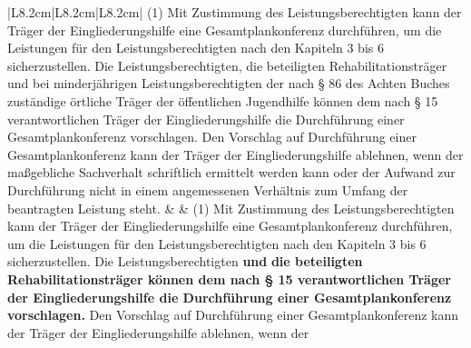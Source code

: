 \documentclass[10pt,a4paper,landscape]{article}
\begin{document}
\begin{longtable}{|L{8.2cm}|L{8.2cm}|L{8.2cm}|}
(1) Mit Zustimmung des  \newline Leistungsberechtigten kann der Träger der  \newline Eingliederungshilfe eine  \newline Gesamtplankonferenz durchführen, um die  \newline Leistungen für den Leistungsberechtigten  \newline nach den Kapiteln 3 bis 6 sicherzustellen.  \newline Die \textcolor{diffred}{Leistungsberechtigten,} die beteiligten  \newline Rehabilitationsträger \textcolor{diffred}{und bei  \newline minderjährigen Leistungsberechtigten der  \newline nach \S{} 86 des Achten Buches zuständige  \newline örtliche Träger der öffentlichen Jugendhilfe}  \newline können dem nach \S{} 15 verantwortlichen  \newline Träger der Eingliederungshilfe die  \newline Durchführung einer Gesamtplankonferenz  \newline vorschlagen. Den Vorschlag auf  \newline Durchführung einer Gesamtplankonferenz  \newline kann der Träger der Eingliederungshilfe  \newline ablehnen, wenn der maßgebliche  \newline Sachverhalt schriftlich ermittelt werden  \newline kann oder der Aufwand zur Durchführung  \newline nicht in einem angemessenen Verhältnis  \newline zum Umfang der beantragten Leistung  \newline steht. &  & (1) Mit Zustimmung des  \newline Leistungsberechtigten kann der Träger der  \newline Eingliederungshilfe eine  \newline Gesamtplankonferenz durchführen, um die  \newline Leistungen für den Leistungsberechtigten  \newline nach den Kapiteln 3 bis 6 sicherzustellen.  \newline Die \textcolor{diffgreen}{Leistungsberechtigten }\textbf{\textcolor{diffgreen}{und}}\textbf{ die  \newline beteiligten Rehabilitationsträger können  \newline dem nach \S{} 15 verantwortlichen Träger  \newline der Eingliederungshilfe die  \newline Durchführung einer  \newline Gesamtplankonferenz vorschlagen. }Den  \newline Vorschlag auf Durchführung einer  \newline Gesamtplankonferenz kann der Träger der  \newline Eingliederungshilfe ablehnen, wenn der  
\end{longtable}
\end{document}
